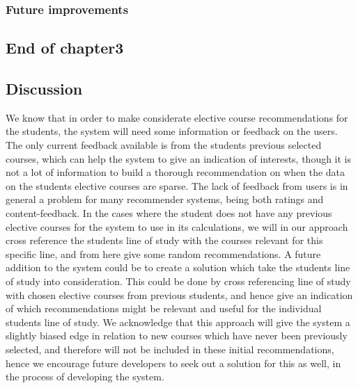 
\subsubsection{Future improvements} %
\label{sub:future_improvements}


\subsection{End of chapter3} %
\label{sub:end_of_chapter3}

\subsection{Discussion}
We know that in order to make considerate elective course recommendations for the students, the system will need some information or feedback on the users. The only current feedback available is from the students previous selected courses, which can help the system to give an indication of interests, though it is not a lot of information to build a thorough recommendation on when the data on the students elective courses are sparse. The lack of feedback from users is in general a problem for many recommender systems, being both ratings and content-feedback. In the cases where the student does not have any previous elective courses for the system to use in its calculations, we will in our approach cross reference the students line of study with the courses relevant for this specific line, and from here give some random recommendations. A future addition to the system could be to create a solution which take the students line of study into consideration. This could be done by cross referencing line of study with chosen elective courses from previous students, and hence give an indication of which recommendations might be relevant and useful for the individual students line of study. We acknowledge that this approach will give the system a slightly biased edge in relation to new courses which have never been previously selected, and therefore will not be included in these initial recommendations, hence we encourage future developers to seek out a solution for this as well, in the process of developing the system.\\
 
